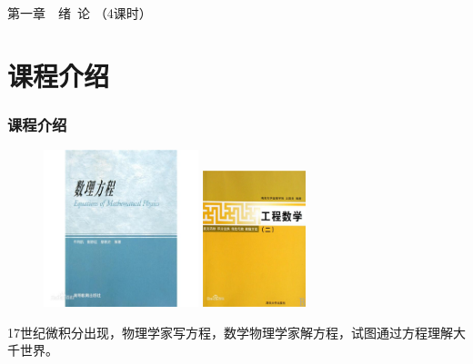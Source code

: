 	\begin{frame}
		\frametitle{}
	    \begin{center}
		{ {\Huge 第一章~~绪~论 （4课时）}}
	    \end{center}    
	\end{frame}

\section{课程介绍}

\begin{frame}
\frametitle{课程介绍}
	\begin{center}
		\begin{figure}
		\begin{minipage}[t]{0.4\textwidth}
			\includegraphics[width=4.5cm]{figs/fig1-2.png}	
		\end{minipage}
		\begin{minipage}[t]{0.4\textwidth}
			\includegraphics[width=3.0cm]{figs/fig1-2-2.png}	
		\end{minipage}
		\end{figure}
	17世纪微积分出现，物理学家写方程，数学物理学家解方程，试图通过方程理解大千世界。
  	\end{center}
\end{frame}

